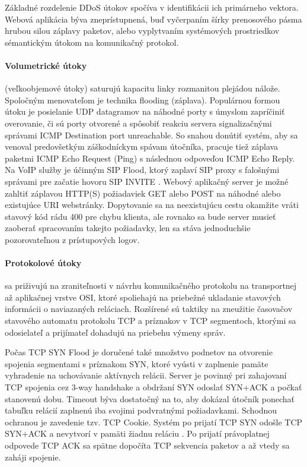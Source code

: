 \documentclass[12pt, a4paper]{article}
\begin{document}
Základné rozdelenie DDoS útokov spočíva v identifikácii ich primárneho vektora. Webová aplikácia
býva zneprístupnená, buď vyčerpaním šírky prenosového pásma hrubou silou záplavy paketov, alebo
vyplytvaním systémových prostriedkov sémantickým útokom na komunikačný protokol.

\paragraph{Volumetrické útoky} (veľkoobjemové útoky) saturujú kapacitu linky rozmanitou plejádou nálože. 
Spoločným menovateľom je technika flooding (záplava). Populárnou formou útoku je posielanie UDP datagramov 
na náhodné porty s úmyslom zapríčiniť overovanie, či sú porty otvorené a spôsobiť reakciu 
servera signalizačnými správami ICMP Destination port unreachable. So snahou donútiť systém, aby sa venoval 
predovšetkým záškodníckym spávam útočníka, pracuje tiež záplava paketmi ICMP Echo Request (Ping) 
s následnou odpoveďou ICMP Echo Reply. Na VoIP služby je účinným SIP Flood, ktorý zaplaví SIP proxy s
falošnými správami pre začatie hovoru SIP INVITE \cite{botnets}. Webový aplikačný server je možné zahltiť 
záplavou HTTP(S) požiadaviek GET alebo POST na náhodné alebo existujúce URI webstránky. Dopytovanie sa na 
neexistujúcu cestu okamžite vráti stavový kód rádu 400 pre  chybu klienta, ale rovnako sa bude server 
musieť zaoberať spracovaním takejto požiadavky, len sa stáva jednoduchšie pozorovateľnou z prístupových 
logov. 

\paragraph{Protokolové útoky} sa priživujú na zraniteľnosti v návrhu komunikačného protokolu na transportnej
až aplikačnej vrstve OSI, ktoré spoliehajú na priebežné ukladanie stavových informácii o naviazaných
reláciach. Rozšírené sú taktiky na zneužitie časovačov stavového automatu protokolu TCP a príznakov v TCP 
segmentoch, ktorými sa odosielateľ a prijímateľ dohadujú na priebehu výmeny správ. 

Počas TCP SYN Flood je doručené také množstvo podnetov na otvorenie spojenia segmentami s príznakom SYN, 
ktoré vyústi v zaplnenie pamäte vyhradenie na uchovávanie aktívnych relácii. Server je povinný pri 
zahajovaní TCP spojenia cez 3-way handshake a obdržaní SYN odoslať SYN+ACK a počkať stanovenú dobu. Timeout 
býva dostatočný na to, aby dokázal útočník ponechať tabuľku relácií zaplnenú iba svojimi podvratnými 
požiadavkami. Schodnou ochranou je zavedenie tzv. TCP Cookie. Systém po prijatí TCP SYN odošle TCP SYN+ACK a 
nevytvorí v pamäti žiadnu reláciu \cite{csirt-ddos}. Po prijatí právoplatnej odpovede TCP ACK sa spätne 
dopočíta TCP sekvencia paketov a až vtedy sa zaháji spojenie. 
\end{document}
